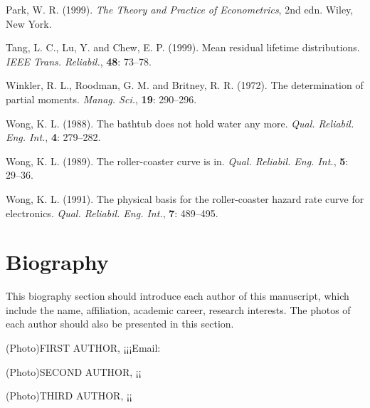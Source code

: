 \documentclass{ws-ijicc}
\begin{document}
\begin{thebibliography}
Park, W. R. (1999). {\it The Theory and Practice of
Econometrics}, 2nd edn. Wiley, New York.

Tang, L. C., Lu, Y. and Chew, E. P. (1999). Mean residual lifetime
distributions. {\it IEEE Trans. Reliabil.}, {\bf 48}: 73--78.

Winkler, R. L., Roodman, G. M. and Britney, R. R. (1972). The
determination of partial moments. {\it Manag. Sci.},
{\bf 19}: 290--296.

Wong, K. L. (1988). The bathtub does not hold water any more.
{\it Qual. Reliabil. Eng. Int.}, {\bf 4}: 279--282.

Wong, K. L. (1989). The roller-coaster curve is in.
{\it Qual. Reliabil. Eng. Int.}, {\bf 5}: 29--36.

Wong, K. L. (1991). The physical basis for the roller-coaster
hazard rate curve for electronics. {\it Qual. Reliabil.
Eng. Int.}, {\bf 7}: 489--495.
\end{thebibliography}


\section*{Biography}
This biography section should introduce each author of this
manuscript, which include the name, affiliation, academic career,
research interests. The photos of each author should also be
presented in this section.

(Photo)FIRST AUTHOR, ¡­¡­¡­Email:

(Photo)SECOND AUTHOR, ¡­¡­

(Photo)THIRD AUTHOR, ¡­¡­
\end{document}
